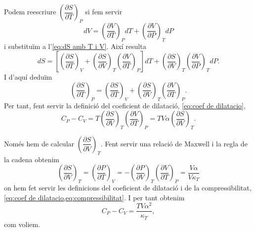 \documentclass[12pt]{article}
\newcommand{\dif}[3]{\left(\frac{\partial #1}{\partial #2}\right)_#3 \! d#2 + \left(\frac{\partial #1}{\partial #3}\right)_#2 \! d#3}
\begin{document}
Podem reescriure \( \left(\dfrac{\partial S}{\partial T}\right)_P \) si fem servir
\begin{equation*}
	dV = \dif{V}{T}{P}
\end{equation*}
i substituïm a l'\cref{eq:dS amb T i V}. Així resulta
\begin{equation*}
	dS = \left[ \left(\dfrac{\partial S}{\partial T}\right)_V + \left(\dfrac{\partial S}{\partial V}\right)_T \left(\dfrac{\partial V}{\partial T}\right)_P \right] dT + \left(\dfrac{\partial S}{\partial V}\right)_T \left(\dfrac{\partial V}{\partial P}\right)_T \! dP.
\end{equation*}
I d'aquí deduïm
\begin{equation*}
	\left(\dfrac{\partial S}{\partial T}\right)_P = \left(\dfrac{\partial S}{\partial T}\right)_V + \left(\dfrac{\partial S}{\partial V}\right)_T \left(\dfrac{\partial V}{\partial T}\right)_P.
\end{equation*}
Per tant, fent servir la definició del coeficient de dilatació, \cref{eq:coef de dilatacio}, 
\begin{equation*}
	C_P - C_V = T\left(\dfrac{\partial S}{\partial V}\right)_T \left(\dfrac{\partial V}{\partial T}\right)_P = TV\alpha \left(\dfrac{\partial S}{\partial V}\right)_T.
\end{equation*}

Només hem de calcular \( \left(\dfrac{\partial S}{\partial V}\right)_T \). Fent servir una relació de Maxwell i la regla de la cadena obtenim 
\begin{equation*}
 	\left(\dfrac{\partial S}{\partial V}\right)_T = \left(\dfrac{\partial P}{\partial T}\right)_V = - \left(\dfrac{\partial P}{\partial V}\right)_T \left(\dfrac{\partial V}{\partial T}\right)_P = \frac{V \alpha}{V \kappa_T}
\end{equation*}
on hem fet servir les definicions del coeficient de dilatació i de la compressibilitat, \cref{eq:coef de dilatacio,eq:compressibilitat}. I per tant obtenim 
\begin{equation*}
	C_P - C_V = \frac{TV \alpha^2}{\kappa_T},
\end{equation*}
com voliem.
\end{document}
